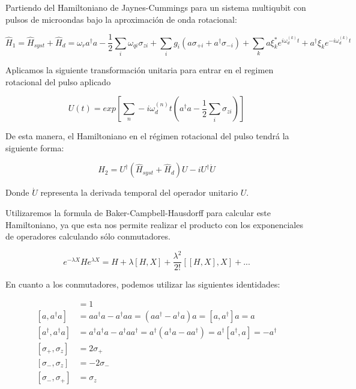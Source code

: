Partiendo del Hamiltoniano de Jaynes-Cummings para un sistema multiqubit con pulsos de microondas bajo la aproximación de onda rotacional:

\begin{equation}
    \hat{H}_1 = \hat{H}_{syst} + \hat{H}_d = \omega_r a^\dag a - \frac{1}{2} \sum\limits_i \omega_{qi} \sigma_{zi} + \sum\limits_i g_i (a \sigma_{+ i} + a^\dagger \sigma_{- i}) + \sum\limits_k a\xi_k^*e^{i\omega_d^{(k)}t}+ a^\dagger\xi_ke^{-i\omega_d^{(k)}t}
\end{equation}

Aplicamos la siguiente transformación unitaria para entrar en el regimen rotacional del pulso aplicado

\begin{equation}
    U(t) = exp[\sum\limits_n-i \omega_d^{(n)} t(a^\dagger a - \frac{1}{2} \sum\limits_i \sigma_{z i})]
\end{equation}

De esta manera, el Hamiltoniano en el régimen rotacional del pulso tendrá la siguiente forma:

\begin{equation}
    \hat{H}_2 = U^\dagger (\hat{H}_{syst} + \hat{H}_d) U - i U^\dagger \dot{U}
\end{equation}

Donde $\dot{U}$ representa la derivada temporal del operador unitario $U$.

Utilizaremos la formula de Baker-Campbell-Hausdorff para calcular este Hamiltoniano, ya que esta nos permite realizar el producto con los exponenciales de operadores calculando sólo conmutadores.

\begin{equation}
    e^{-\lambda X} H e^{\lambda X} = H + \lambda [H,X] + \frac{\lambda^2}{2!}[[H,X],X] + ...
\end{equation}

En cuanto a los conmutadores, podemos utilizar las siguientes identidades:

\begin{align}
    [a, a^\dagger] &= 1
    \label{eq:a_ad} \\
    [a, a^\dagger a] &= a a^\dagger a - a^\dagger a a = (a a^\dagger - a^\dagger a) a = [a, a^\dagger] a = a
    \label{eq:a_ada} \\
    [a^\dagger, a^\dagger a] &= a^\dagger a^\dagger a - a^\dagger a a^\dagger = a^\dagger (a^\dagger a - a a^\dagger) = a^\dagger [a^\dagger, a] = -a^\dagger
    \label{eq:ad_ada} \\
    [\sigma_+, \sigma_z] &= 2 \sigma_+
    \label{eq:sp_sz} \\
    [\sigma_-, \sigma_z] &= - 2 \sigma_-
    \label{eq:sm_sz} \\
    [\sigma_-, \sigma_+] &= \sigma_z
    \label{eq:sm_sp}
\end{align}


